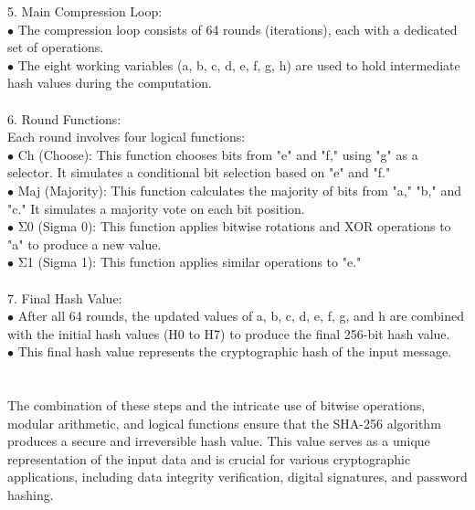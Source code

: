 \documentclass{report}
\begin{document}
5. Main Compression Loop:\\
$\bullet$ The compression loop consists of 64 rounds (iterations), each with a dedicated set of operations.\\
$\bullet$ The eight working variables (a, b, c, d, e, f, g, h) are used to hold intermediate hash values during the computation.\\
\\
6. Round Functions:\\
Each round involves four logical functions:\\
$\bullet$ Ch (Choose): This function chooses bits from "e" and "f," using "g" as a selector. It simulates a conditional bit selection based on "e" and "f."\\
$\bullet$ Maj (Majority): This function calculates the majority of bits from "a," "b," and "c." It simulates a majority vote on each bit position.\\
$\bullet$ Σ0 (Sigma 0): This function applies bitwise rotations and XOR operations to "a" to produce a new value.\\
$\bullet$ Σ1 (Sigma 1): This function applies similar operations to "e."\\
\\
7. Final Hash Value:\\
$\bullet$ After all 64 rounds, the updated values of a, b, c, d, e, f, g, and h are combined with the initial hash values (H0 to H7) to produce the final 256-bit hash value.\\
$\bullet$ This final hash value represents the cryptographic hash of the input message.\\
\\
\\
The combination of these steps and the intricate use of bitwise operations, modular arithmetic, and logical functions ensure that the SHA-256 algorithm produces a secure and irreversible hash value. This value serves as a unique representation of the input data and is crucial for various cryptographic applications, including data integrity verification, digital signatures, and password hashing.
\end{document}
